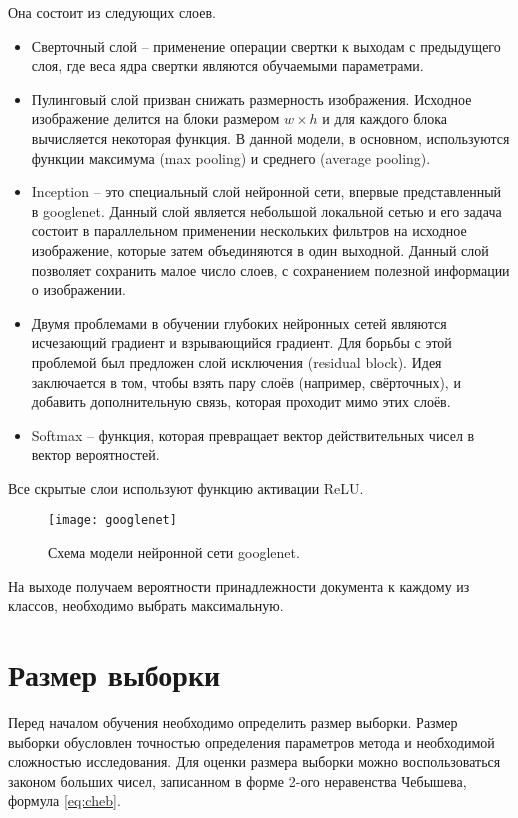 Она состоит из следующих слоев.
\begin{itemize}
\item Сверточный слой -- применение операции свертки к выходам с предыдущего слоя, где веса ядра свертки являются обучаемыми параметрами. 
\item Пулинговый слой призван снижать размерность изображения. Исходное изображение делится на блоки размером $w \times h$ и для каждого блока вычисляется некоторая функция. В данной модели, в основном, используются функции максимума (max pooling) и среднего (average pooling). 
\item  Inception -- это специальный слой нейронной сети, впервые представленный в googlenet. Данный слой является небольшой локальной сетью и его задача состоит в параллельном применении нескольких фильтров на исходное изображение, которые затем объединяются в один выходной. Данный слой позволяет сохранить малое число слоев, с сохранением полезной информации о изображении.
\item  Двумя проблемами в обучении глубоких нейронных сетей являются исчезающий градиент и взрывающийся градиент. Для борьбы с этой проблемой был предложен слой исключения (residual block). Идея заключается в том, чтобы взять пару слоёв (например, свёрточных), и добавить дополнительную связь, которая проходит мимо этих слоёв. 
\item  Softmax -- функция, которая превращает вектор действительных чисел в вектор вероятностей. 
\end{itemize}

Все скрытые слои используют функцию активации ReLU.
 
\begin{figure}[H]
	\centering
	\texttt{[image: googlenet]}
	\caption{Схема модели нейронной сети googlenet. }
	\label{img:googlenet}
\end{figure}

На выходе получаем вероятности принадлежности документа к каждому из классов, необходимо выбрать максимальную.

\section{Размер выборки}

Перед началом обучения необходимо определить размер выборки. Размер выборки обусловлен точностью определения параметров метода и необходимой сложностью исследования. Для оценки размера выборки можно воспользоваться законом больших чисел, записанном в форме 2-ого неравенства Чебышева, формула
 \ref{eq:cheb}. \cite{cheb}


